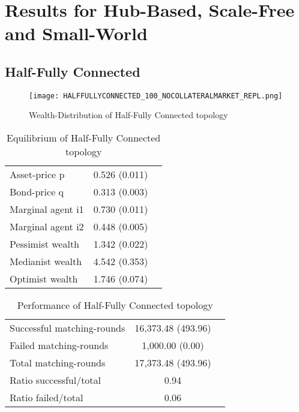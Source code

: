 \documentclass[Bachelorarbeit.tex]{subfiles}
\begin{document}
\graphicspath{{./figures/appendixResults/}}	%

\chapter{Results for Hub-Based, Scale-Free and Small-World}
\label{app:results}

\section{Half-Fully Connected}
\begin{figure}[H]
	\centering
  \texttt{[image: HALFFULLYCONNECTED\_100\_NOCOLLATERALMARKET\_REPL.png]}
	\caption{Wealth-Distribution of Half-Fully Connected topology }
	\label{fig:wealth_HALFFULLYCONNECTED_100_NOCOLLATERALMARKET_REPL}
\end{figure}

\begin{table}[H]
	\caption{Equilibrium of Half-Fully Connected topology}
	\centering
	\begin{tabular} { l c r }
		\hline
		Asset-price p & 0.526 (0.011) \\
		Bond-price q & 0.313 (0.003) \\
		Marginal agent i1 & 0.730 (0.011) \\
		Marginal agent i2 & 0.448 (0.005) \\
		\hline
		Pessimist wealth & 1.342 (0.022) \\
		Medianist wealth & 4.542 (0.353) \\
		Optimist wealth & 1.746 (0.074) \\
		\hline
	\end{tabular}
\end{table} 

\begin{table}[H]
	\caption{Performance of Half-Fully Connected topology}
	\centering
	\begin{tabular} { l c r }
		\hline
		Successful matching-rounds & 16,373.48 (493.96) \\
		Failed matching-rounds & 1,000.00 (0.00) \\
		Total matching-rounds & 17,373.48 (493.96) \\
		\hline
		Ratio successful/total & 0.94 \\
		Ratio failed/total & 0.06 \\
		\hline
	\end{tabular}
\end{table}
\end{document}
